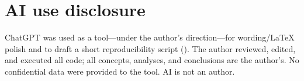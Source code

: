 \documentclass[11pt,a4paper]{article}
\begin{document}
\section*{AI use disclosure}
ChatGPT was used as a tool—under the author's direction—for wording/\LaTeX{}
polish and to draft a short reproducibility script
(). The author reviewed, edited, and executed all
code; all concepts, analyses, and conclusions are the author's. No confidential
data were provided to the tool. AI is not an author.

\ifwithglossary
  \printglossary[type=\acronymtype,title={Acronyms}]
  \printglossary[title={Glossary}]
\fi

\ifshowbib
  \nocite{*} %
  \printbibliography
\fi
\end{document}

